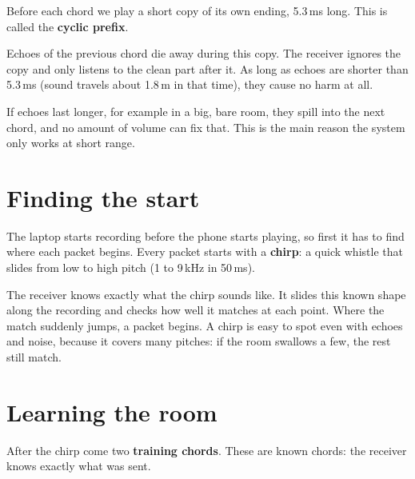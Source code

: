 \documentclass[12pt,a4paper]{article}
\begin{document}
Before each chord we play a short copy of its own ending, 5.3\,ms long. This
is called the \textbf{cyclic prefix}.

\begin{center}
\end{center}

Echoes of the previous chord die away during this copy. The receiver ignores
the copy and only listens to the clean part after it. As long as echoes are
shorter than 5.3\,ms (sound travels about 1.8\,m in that time), they cause no
harm at all.

If echoes last longer, for example in a big, bare room, they spill into the next
chord, and no amount of volume can fix that. This is the main reason the
system only works at short range.

\section{Finding the start}

The laptop starts recording before the phone starts playing, so first it has
to find where each packet begins. Every packet starts with a \textbf{chirp}: a
quick whistle that slides from low to high pitch (1 to 9\,kHz in 50\,ms).

The receiver knows exactly what the chirp sounds like. It slides this known
shape along the recording and checks how well it matches at each point. Where
the match suddenly jumps, a packet begins. A chirp is easy to spot even with
echoes and noise, because it covers many pitches: if the room swallows a few,
the rest still match.

\section{Learning the room}

After the chirp come two \textbf{training chords}. These are known chords: the
receiver knows exactly what was sent.
\end{document}
